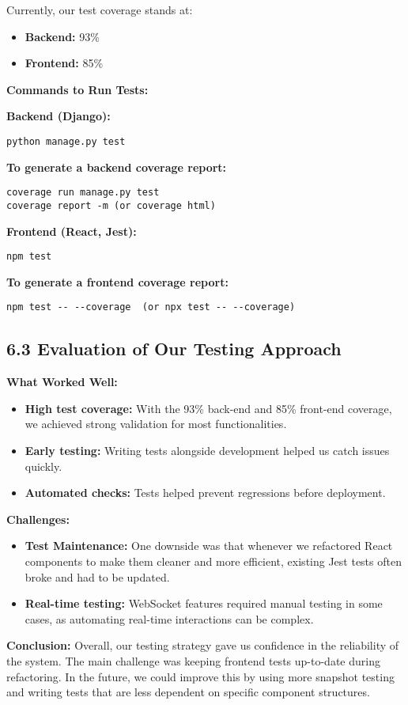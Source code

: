 \documentclass{article}
\begin{document}
Currently, our test coverage stands at:
\begin{itemize}
    \item \textbf{Backend:} 93\%
    \item \textbf{Frontend:} 85\%
\end{itemize}

\textbf{Commands to Run Tests:}

\textbf{Backend (Django):}
\begin{verbatim}
python manage.py test
\end{verbatim}

\textbf{To generate a backend coverage report:}
\begin{verbatim}
coverage run manage.py test 
coverage report -m (or coverage html)
\end{verbatim}

\textbf{Frontend (React, Jest):}
\begin{verbatim}
npm test
\end{verbatim}

\textbf{To generate a frontend coverage report:}
\begin{verbatim}
npm test -- --coverage  (or npx test -- --coverage)
\end{verbatim}

\subsection{6.3 Evaluation of Our Testing Approach}
\textbf{What Worked Well:}
\begin{itemize}
    \item \textbf{High test coverage:} With the 93\% back-end and 85\% front-end coverage, we achieved strong validation for most functionalities.
    \item \textbf{Early testing:} Writing tests alongside development helped us catch issues quickly.
    \item \textbf{Automated checks:} Tests helped prevent regressions before deployment.
\end{itemize}

\textbf{Challenges:}
\begin{itemize}
    \item \textbf{Test Maintenance:} One downside was that whenever we refactored React components to make them cleaner and more efficient, existing Jest tests often broke and had to be updated.
    \item \textbf{Real-time testing:} WebSocket features required manual testing in some cases, as automating real-time interactions can be complex.
\end{itemize}

\textbf{Conclusion:}  
Overall, our testing strategy gave us confidence in the reliability of the system. The main challenge was keeping frontend tests up-to-date during refactoring. In the future, we could improve this by using more snapshot testing and writing tests that are less dependent on specific component structures.
\end{document}
